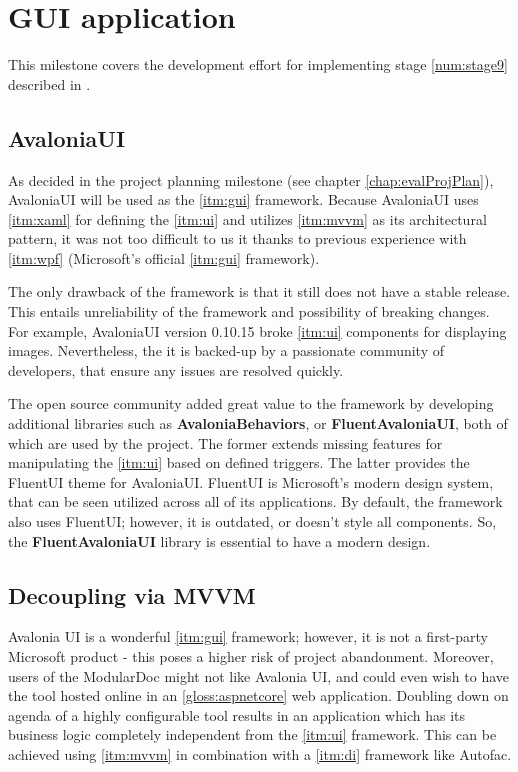\chapter{GUI application}

This milestone covers the development effort for implementing stage \ref{num:stage9} described in .

\section{AvaloniaUI}

As decided in the project planning milestone (see chapter \ref{chap:evalProjPlan}), AvaloniaUI will be used as the \ref{itm:gui} framework.
Because AvaloniaUI uses \ref{itm:xaml} for defining the \ref{itm:ui} and utilizes \ref{itm:mvvm} as its architectural pattern, it was not too difficult to us it thanks to previous experience with \ref{itm:wpf} (Microsoft's official \ref{itm:gui} framework).

The only drawback of the framework is that it still does not have a stable release. This entails unreliability of the framework and possibility of breaking changes. For example, AvaloniaUI version 0.10.15 broke \ref{itm:ui} components for displaying images. Nevertheless, the it is backed-up by a passionate community of developers, that ensure any issues are resolved quickly.

The open source community added great value to the framework by developing additional libraries such as \textbf{AvaloniaBehaviors}, or \textbf{FluentAvaloniaUI}, both of which are used by the project. The former extends missing features for manipulating the \ref{itm:ui} based on defined triggers. The latter provides the FluentUI theme for AvaloniaUI. FluentUI is Microsoft's modern design system, that can be seen utilized across all of its applications. By default, the framework also uses FluentUI; however, it is outdated, or doesn't style all components. So, the \textbf{FluentAvaloniaUI} library is essential to have a modern design.

\section{Decoupling via MVVM}

Avalonia UI is a wonderful \ref{itm:gui} framework; however, it is not a first-party Microsoft product - this poses a higher risk of project abandonment. Moreover, users of the ModularDoc might not like Avalonia UI, and could even wish to have the tool hosted online in an \ref{gloss:aspnetcore} web application. Doubling down on agenda of a highly configurable tool results in an application which has its business logic completely independent from the \ref{itm:ui} framework.
This can be achieved using \ref{itm:mvvm} in combination with a \ref{itm:di} framework like Autofac.

